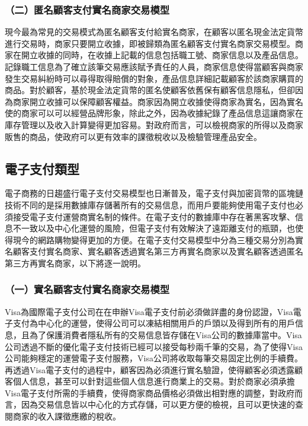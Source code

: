 		\subsubsection{（二）匿名顧客支付實名商家交易模型}
		現今最為常見的交易模式為匿名顧客支付給實名商家，在顧客以匿名現金法定貨幣進行交易時，商家只要開立收據，即被歸類為匿名顧客支付實名商家交易模型。商家在開立收據的同時，在收據上記載的信息包括職工號、商家信息以及產品信息。記錄職工信息為了確立該筆交易應該賦予責任的人員，商家信息使得當顧客與商家發生交易糾紛時可以尋得取得賠償的對象，產品信息詳細記載顧客於該商家購買的商品。對於顧客，基於現金法定貨幣的匿名使顧客依舊保有顧客信息隱私，但卻因為商家開立收據可以保障顧客權益。商家因為開立收據使得商家為實名，因為實名使的商家可以可以經營品牌形象，除此之外，因為收據紀錄了產品信息這讓商家在庫存管理以及收入計算變得更加容易。對政府而言，可以檢視商家的所得以及商家販售的商品，使政府可以更有效率的課徵稅收以及檢驗管理產品安全。

	\subsection{電子支付類型}
	電子商務的日趨盛行電子支付交易模型也日漸普及，電子支付與加密貨幣的區塊鏈技術不同的是採用數據庫存儲著所有的交易信息，而用戶要能夠使用電子支付也必須接受電子支付運營商實名制的條件。在電子支付的數據庫中存在著黑客攻擊、信息不一致以及中心化運營的風險，但電子支付有效解決了遠距離支付的瓶頸，也使得現今的網路購物變得更加的方便。在電子支付交易模型中分為三種交易分別為實名顧客支付實名商家、實名顧客透過實名第三方再實名商家以及實名顧客透過匿名第三方再實名商家，以下將逐一說明。

		\subsubsection{（一）實名顧客支付實名商家交易模型}
		Visa為國際電子支付公司在在申辦Visa電子支付前必須做詳盡的身份認證，Visa電子支付為中心化的運營，使得公司可以凍結相關用戶的戶頭以及得到所有的用戶信息，且為了保護消費者隱私所有的交易信息皆存儲在Visa公司的數據庫當中。Visa公司透過不斷的優化電子支付技術已經可以接受每秒兩千筆的交易，為了使得Visa公司能夠穩定的運營電子支付服務，Visa公司將收取每筆交易固定比例的手續費。再透過Visa電子支付的過程中，顧客因為必須進行實名驗證，使得顧客必須透露顧客個人信息，甚至可以針對這些個人信息進行商業上的交易。對於商家必須承擔Visa電子支付所需的手續費，使得商家商品價格必須做出相對應的調整，對政府而言，因為交易信息皆以中心化的方式存儲，可以更方便的檢視，且可以更快速的查閱商家的收入課徵應繳的稅收。
		

